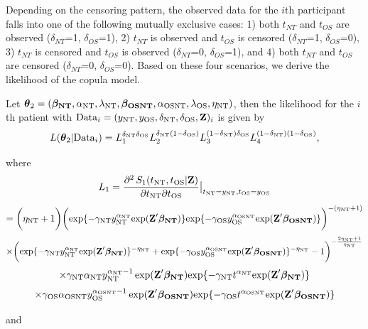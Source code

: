 \documentclass[12pt]{article}
\begin{document}
Depending on the censoring pattern, the observed data for the $i$th participant falls into one of the following mutually exclusive cases: 1) both $t_{NT}$ and $t_{OS}$ are observed ($\delta_{NT}$=1, $\delta_{OS}$=1), 2) $t_{NT}$ is observed and $t_{OS}$ is censored ($\delta_{NT}$=1, $\delta_{OS}$=0), 3) $t_{NT}$ is censored and $t_{OS}$ is observed ($\delta_{NT}$=0, $\delta_{OS}$=1), and 4) both $t_{NT}$ and $t_{OS}$ are censored ($\delta_{NT}$=0, $\delta_{OS}$=0). Based on these four scenarios, we derive the likelihood of the copula model. 

Let
$\boldsymbol{\theta}_2=(\boldsymbol{\beta_{\rm NT}}, \alpha_{\rm NT}, \lambda_{\rm NT}, \boldsymbol{\beta_{\rm OSNT}},
\alpha_{\rm OSNT}, \lambda_{\rm OS}, \eta_{\rm NT})$,  then the
likelihood for the $i$th patient with ${\rm Data}_i=(y_{\rm NT}, y_{\rm OS},
\delta_{\rm NT}, \delta_{\rm OS}, \textbf{Z})_i$ is given by
$$
L(\boldsymbol{\theta}_2|{\rm Data}_i)
=L_1^{\delta_{\rm NT}\delta_{\rm OS}}
L_2^{\delta_{\rm NT}(1-\delta_{\rm OS})}L_3^{(1-\delta_{\rm NT})\delta_{\rm OS}}
L_4^{(1-\delta_{\rm NT})(1-\delta_{\rm OS})}, 
$$

where
$$
L_1=\frac{\partial^2\, S_1(t_{\rm NT}, t_{\rm OS}|\textbf{Z})}{\partial t_{\rm NT} \partial t_{\rm OS}}\big|_{t_{\rm NT}=y_{\rm NT},t_{\rm OS}=y_{\rm OS}}
$$
$$
=\bigg(\eta_{\rm NT}+1\bigg)\bigg(\mathrm{exp}\{-\gamma_{\rm NT} y_{\rm NT}^{\alpha_{\rm NT}}
\mathrm{exp}(\textbf{Z}' \boldsymbol{\beta_{\rm NT}} )\} \mathrm{exp}\{-\gamma_{\rm OS} y_{\rm OS}^{\alpha_{\rm OSNT}}
\mathrm{exp}(\textbf{Z}' \boldsymbol{\beta_{\rm OSNT}} )\}\bigg)^{-(\eta_{\rm NT}+1)}
$$
$$
\times \bigg(\mathrm{exp}\{-\gamma_{\rm NT} y_{\rm NT}^{\alpha_{\rm NT}}
\mathrm{exp}(\textbf{Z}' \boldsymbol{\beta_{\rm NT}} )\}^{-\eta_{\rm NT}}+\mathrm{exp}\{-\gamma_{\rm OS} y_{\rm OS}^{\alpha_{\rm OSNT}}
\mathrm{exp}(\textbf{Z}' \boldsymbol{\beta_{\rm OSNT}} )\}^{-\eta_{\rm NT}}-1\bigg)^{-\frac{2\eta_{\rm NT}+1}{\eta_{\rm NT}}}
$$
$$
\times \gamma_{\rm NT} \alpha_{\rm NT} y_{\rm NT}^{{\alpha_{\rm NT} -1}} \exp(\textbf{Z}' \boldsymbol{\beta_{\rm NT}}) \mathrm{exp}\{-\gamma_{\rm NT} t^{\alpha_{\rm NT}}
\mathrm{exp}(\textbf{Z}' \boldsymbol{\beta_{\rm NT}} )\}
$$
$$
\times \gamma_{\rm OS} \alpha_{\rm OSNT} y_{\rm OS}^{{\alpha_{\rm OSNT} -1}} \exp(\textbf{Z}' \boldsymbol{\beta_{\rm OSNT}}) \mathrm{exp}\{-\gamma_{\rm OS} t^{\alpha_{\rm OSNT}}
\mathrm{exp}(\textbf{Z}' \boldsymbol{\beta_{\rm OSNT}} )\}
$$

and
\end{document}
